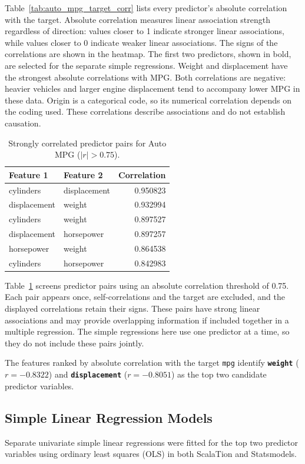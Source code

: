 \documentclass[11pt]{article}
\begin{document}
Table~\ref{tab:auto_mpg_target_corr} lists every predictor's absolute correlation with the target. Absolute correlation measures linear association strength regardless of direction: values closer to 1 indicate stronger linear associations, while values closer to 0 indicate weaker linear associations. The signs of the correlations are shown in the heatmap. The first two predictors, shown in bold, are selected for the separate simple regressions. Weight and displacement have the strongest absolute correlations with MPG. Both correlations are negative: heavier vehicles and larger engine displacement tend to accompany lower MPG in these data. Origin is a categorical code, so its numerical correlation depends on the coding used. These correlations describe associations and do not establish causation.

\begin{table}[H]
\centering
\small
\begin{tabular}{llr}
\toprule
Feature 1 & Feature 2 & Correlation \\
\midrule
cylinders & displacement & 0.950823 \\
displacement & weight & 0.932994 \\
cylinders & weight & 0.897527 \\
displacement & horsepower & 0.897257 \\
horsepower & weight & 0.864538 \\
cylinders & horsepower & 0.842983 \\
\bottomrule
\end{tabular}
\caption{Strongly correlated predictor pairs for Auto MPG ($|r| > 0.75$).}
\label{tab:auto_mpg_predictor_pairs}
\end{table}

Table~\ref{tab:auto_mpg_predictor_pairs} screens predictor pairs using an absolute correlation threshold of 0.75. Each pair appears once, self-correlations and the target are excluded, and the displayed correlations retain their signs. These pairs have strong linear associations and may provide overlapping information if included together in a multiple regression. The simple regressions here use one predictor at a time, so they do not include these pairs jointly.

The features ranked by absolute correlation with the target \texttt{mpg} identify \textbf{\texttt{weight}} ($r = -0.8322$) and \textbf{\texttt{displacement}} ($r = -0.8051$) as the top two candidate predictor variables.

\subsection{Simple Linear Regression Models}
Separate univariate simple linear regressions were fitted for the top two predictor variables using ordinary least squares (OLS) in both ScalaTion and Statsmodels.
\end{document}
